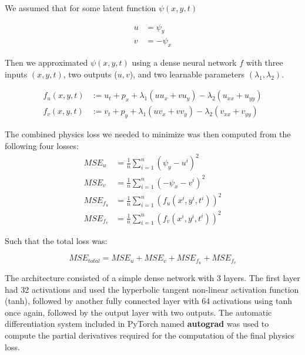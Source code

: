 We assumed that for some latent function $\psi(x, y, t)$

\begin{equation}
\begin{split}
    u &= \psi_y \\
    v &= -\psi_x
\end{split}
\end{equation}

Then we approximated $\psi(x, y, t)$ using a dense neural network $f$ with three inputs $(x, y, t)$, two outputs ($u, v$), and two learnable parameters $(\lambda_1, \lambda_2)$.

\begin{equation}
\begin{split}
    f_u(x,y,t) &:= u_t + p_x + \lambda_1 (uu_x + vu_y) - \lambda_2 (u_{xx} + u_{yy}) \\
    f_v(x,y,t) &:= v_t + p_y + \lambda_1 (uv_x + vv_y) - \lambda_2 (v_{xx} + v_{yy})
\end{split}
\end{equation}

The combined physics loss we needed to minimize was then computed from the following four losses:
\begin{equation}
\begin{split}
    MSE_u &= \frac{1}{n} \sum_{i=1}^{n}(\psi_y - u^i)^2 \\
    MSE_v &= \frac{1}{n} \sum_{i=1}^{n}(-\psi_x - v^i)^2 \\
    MSE_{f_u} &= \frac{1}{n} \sum_{i=1}^{n}(f_u(x^i,y^i,t^i))^2 \\
    MSE_{f_v} &= \frac{1}{n} \sum_{i=1}^{n}(f_v(x^i,y^i,t^i))^2
\end{split}
\end{equation}

Such that the total loss was:

\begin{equation}
    MSE_{total} = MSE_u + MSE_v + MSE_{f_u} + MSE_{f_v}
\end{equation}

The architecture consisted of a simple dense network with 3 layers. The first layer had 32 activations and used the hyperbolic tangent non-linear activation function (tanh), followed by another fully connected layer with 64 activations using tanh once again, followed by the output layer with two outputs. The automatic differentiation system included in PyTorch named \textbf{autograd} was used to compute the partial derivatives required for the computation of the final physics loss.

